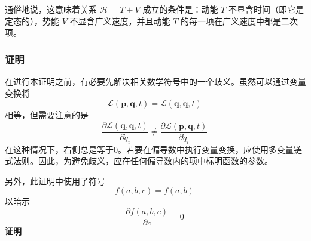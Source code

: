 通俗地说，这意味着关系 \( \mathcal{H} = T + V \) 成立的条件是：动能 \( T \) 不显含时间（即它是定态的），势能 \( V \) 不显含广义速度，并且动能 \( T \) 的每一项在广义速度中都是二次项。
\subsubsection{证明}
在进行本证明之前，有必要先解决相关数学符号中的一个歧义。虽然可以通过变量变换将 
\[
\mathcal{L}(\boldsymbol{p}, \boldsymbol{q}, t) = \mathcal{L}(\boldsymbol{q}, \boldsymbol{\dot{q}}, t)~
\]
相等，但需要注意的是
\[
\frac{\partial \mathcal{L}(\boldsymbol{q}, \boldsymbol{\dot{q}}, t)}{\partial \dot{q}_i} \neq \frac{\partial \mathcal{L}(\boldsymbol{p}, \boldsymbol{q}, t)}{\partial \dot{q}_i}~
\]
在这种情况下，右侧总是等于0。若要在偏导数中执行变量变换，应使用多变量链式法则。因此，为避免歧义，应在任何偏导数内的项中标明函数的参数。

另外，此证明中使用了符号 
\[
f(a, b, c) = f(a, b)~
\]
以暗示
\[
\frac{\partial f(a, b, c)}{\partial c} = 0~
\]
\textbf{证明}
